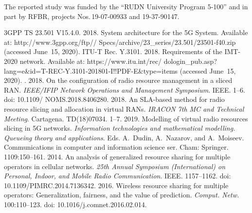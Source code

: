 

\vspace*{-20pt}

\Ack
\noindent
The reported study was funded by the ``RUDN University Program 5-100'' and in
part by RFBR, projects  
Nos.\,19-07-00933 and 19-37-90147.

\vspace*{4pt}

 \begin{multicols}{2}

\renewcommand{\bibname}{\protect\rmfamily References}

{\small\frenchspacing
 {%
 \begin{thebibliography}{9}
 
 \vspace*{-2pt}
 
3GPP TS 23.501 V15.4.0. 2018. System architecture for the 5G System. 
Available at: {\sf 
http://www.3gpp.org/ftp// Specs/archive/23\_series/23.501/23501-f40.zip} 
(accessed June~15, 2020).
ITU-T Rec. Y.3101. 2018. Requirements of the IMT-2020 network. Available at: {\sf 
https://www.itu.int/rec/ dologin\_pub.asp?lang=e\&id=T-REC-Y.3101-201801-I!!PDF-E\&type=items} 
(accessed June~15, 2020).
. 2018. On the configuration of radio resource management in a sliced 
RAN. \textit{IEEE/IFIP Network Operations and Management Symposium}.
 IEEE. 1--6.  doi: 10.1109/ NOMS.2018.8406280.
 2018. An SLA-based method for radio resource 
slicing and allocation in virtual RANs. \textit{IRACON 7th MC and Technical Meeting}. Cartagena. 
TD(18)07034. 1--7.
2019. Modelling of virtual radio resources slicing in 5G networks. 
\textit{Information technologies and 
mathematical modelling. Queueing theory and applications}. Eds. 
A.~Dudin, A.~Nazarov, and A.~Moiseev. 
Communications in computer and information science ser. Cham:
Springer. 1109:150--161. 
 2014. An analysis of generalized resource sharing for 
multiple operators in cellular networks. \textit{25th Annual Symposium (International)
on Personal,  Indoor, and Mobile Radio Communication}. IEEE. 1157--1162. 
doi:  10.1109/PIMRC.2014.7136342.
 2016. Wireless resource sharing for multiple operators: 
Generalization, fairness, and the value of prediction. \textit{Comput. Netw.} 100:110--123.
doi: 10.1016/j.comnet.2016.02.014.


\end{thebibliography}}}
\end{multicols}
